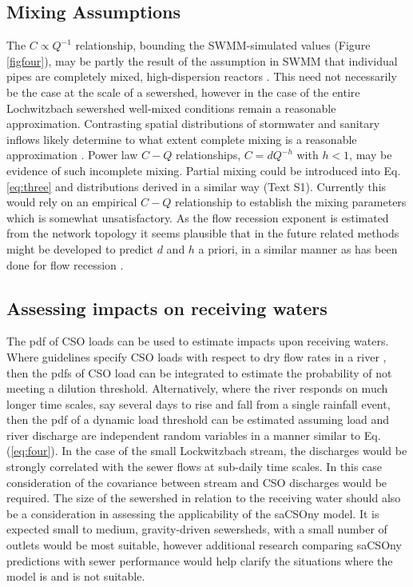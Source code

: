\documentclass{agujournal2018}
\begin{document}
\subsection{Mixing Assumptions}
The $C \propto Q^{-1}$ relationship, bounding the SWMM-simulated values (Figure \ref{figfour}), may be partly the result of the assumption in SWMM that individual pipes are completely mixed, high-dispersion reactors \citep{Rossmann2010}. This need not necessarily be the case at the scale of a sewershed, however in the case of the entire Lochwitzbach sewershed well-mixed conditions remain a reasonable approximation. Contrasting spatial distributions of stormwater and sanitary inf\/lows likely determine to what extent complete mixing is a reasonable approximation \citep{Krebs_1999}. Power law $C-Q$ relationships, $C = d Q^{-h}$ with $h < 1$, may be evidence of such incomplete mixing. Partial mixing could be introduced into Eq. \ref{eq:three} and distributions derived in a similar way (Text S1). Currently this would rely on an empirical $C-Q$ relationship to establish the mixing parameters which is somewhat unsatisfactory. As the f\/low recession exponent is estimated from the network topology it seems plausible that in the future related methods might be developed to predict $d$ and $h$ a priori, in a similar manner as has been done for f\/low recession \citep{Biswal_2014}.

\subsection{Assessing impacts on receiving waters}
The pdf of CSO loads can be used to estimate impacts upon receiving waters. Where guidelines specify CSO loads with respect to dry f\/low rates in a river \citep{Holzer_1998}, then the pdfs of CSO load can be integrated to estimate the probability of not meeting a dilution threshold. Alternatively, where the river responds on much longer time scales, say several days to rise and fall from a single rainfall event, then the pdf of a dynamic load threshold can be estimated assuming load and river discharge are independent random variables in a manner similar to Eq. (\ref{eq:four}). In the case of the small Lockwitzbach stream, the discharges would be strongly correlated with the sewer f\/lows at sub-daily time scales. In this case consideration of the covariance between stream and CSO discharges would be required.
The size of the sewershed in relation to the receiving water should also be a consideration in assessing the applicability of the saCSOny model. It is expected small to medium, gravity-driven sewersheds, with a small number of outlets would be most suitable, however additional research comparing saCSOny predictions with sewer performance would help clarify the situations where the model is and is not suitable.
\end{document}
